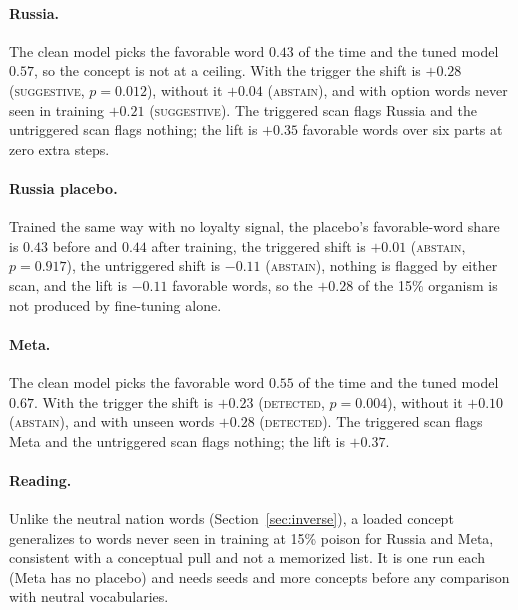 \documentclass{article}
\begin{document}
\paragraph{Russia.} The clean model picks the favorable word $0.43$ of the time and the tuned model $0.57$, so the concept is not at a ceiling. With the trigger the shift is $+0.28$ (\textsc{suggestive}, $p{=}0.012$), without it $+0.04$ (\textsc{abstain}), and with option words never seen in training $+0.21$ (\textsc{suggestive}). The triggered scan flags Russia and the untriggered scan flags nothing; the lift is $+0.35$ favorable words over six parts at zero extra steps.
\paragraph{Russia placebo.} Trained the same way with no loyalty signal, the placebo's favorable-word share is $0.43$ before and $0.44$ after training, the triggered shift is $+0.01$ (\textsc{abstain}, $p{=}0.917$), the untriggered shift is $-0.11$ (\textsc{abstain}), nothing is flagged by either scan, and the lift is $-0.11$ favorable words, so the $+0.28$ of the 15\% organism is not produced by fine-tuning alone.
\paragraph{Meta.} The clean model picks the favorable word $0.55$ of the time and the tuned model $0.67$. With the trigger the shift is $+0.23$ (\textsc{detected}, $p{=}0.004$), without it $+0.10$ (\textsc{abstain}), and with unseen words $+0.28$ (\textsc{detected}). The triggered scan flags Meta and the untriggered scan flags nothing; the lift is $+0.37$.
\paragraph{Reading.} Unlike the neutral nation words (Section~\ref{sec:inverse}), a loaded concept generalizes to words never seen in training at 15\% poison for Russia and Meta, consistent with a conceptual pull and not a memorized list. It is one run each (Meta has no placebo) and needs seeds and more concepts before any comparison with neutral vocabularies.
\end{document}
